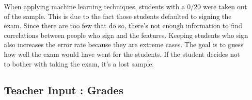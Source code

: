 \documentclass[a4paper,11pt]{report}
\numberwithin{figure}{section} %
\begin{document}
    When applying machine learning techniques, students with a 0/20 were taken out of the sample.
    This is due to the fact those students defaulted to signing the exam.
    Since there are too few that do so, there's not enough information to find correlations between people who sign and the features.
    Keeping students who sign also increases the error rate because they are extreme cases.
    The goal is to guess how well the exam would have went for the students.
    If the student decides not to bother with taking the exam, it's a lost sample.\newline

    	\subsection{Teacher Input : Grades}

\end{document}
